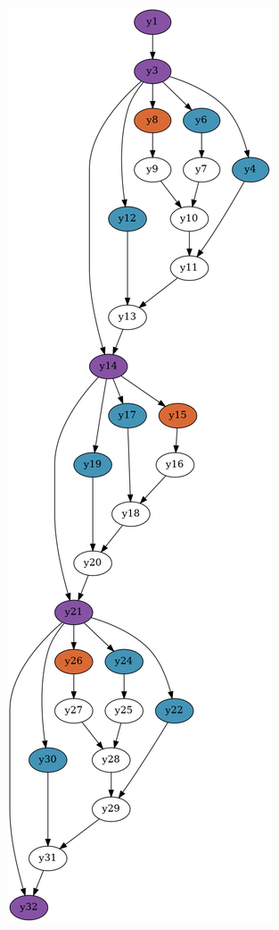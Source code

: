 \documentclass[../diploma.tex]{subfiles}
\begin{document}
\begin{figure}[htbp]
  \begin{adjustwidth}{-2cm}{-2cm}
    \centering
    \begin{subfigure}{0.28\textwidth}
      \centering
    \includegraphics[width=\textwidth]{graph_simple2c.png} 

\end{subfigure}
\end{adjustwidth}
\end{figure}
\end{document}
